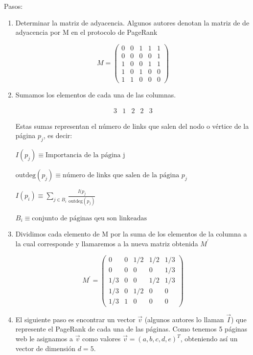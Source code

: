 \documentclass[11pt, spanish]{report}
\begin{document}
Pasos:
\begin{enumerate}
\item Determinar la matriz de adyacencia. Algunos autores denotan la matriz de de adyacencia por M en el protocolo de PageRank

\[
M = \begin{pmatrix}
0 & 0 & 1 & 1 & 1 \\
0 & 0 & 0 & 0 & 1 \\
1 & 0 & 0 & 1 & 1 \\
1 & 0 & 1 & 0 & 0 \\
1 & 1 & 0 & 0 & 0
\end{pmatrix}
\]

\item Sumamos los elementos de cada una de las columnas.

\[
\begin{matrix}
3 & 1 & 2 & 2 & 3
\end{matrix}
\]

Estas sumas representan el número de links que salen del nodo o vértice de la página $p_j$, es decir: 

$I(p_j) \equiv \text{Importancia de la página j}$

$\mathrm{outdeg}(p_j) \equiv \text{número de links que salen de la página } p_j$

$I(p_i) \equiv \sum\limits_{j \in B_i} \frac{I(p_j}{\mathrm{outdeg}(p_j)}$

$B_i \equiv \text{conjunto de páginas qeu son linkeadas}$

\item Dividimos cada elemento de M por la suma de los elementos de la columna a la cual corresponde y llamaremos a la nueva matriz obtenida $M^\prime$

\[
M^\prime = \begin{pmatrix}
0 & 0 & 1/2 & 1/2 & 1/3 \\
0 & 0 & 0 & 0 & 1/3 \\
1/3 & 0 & 0 & 1/2 & 1/3 \\
1/3 & 0 & 1/2 & 0 & 0 \\
1/3 & 1 & 0 & 0 & 0
\end{pmatrix}
\]

\item El siguiente paso es encontrar un vector $\vec{v}$ (algunos autores lo llaman $\vec{I}$) que represente el PageRank de cada una de las páginas. Como tenemos 5 páginas web le asignamos a $\vec{v}$ como valores $\vec{v} = (a,b,c,d,e)^T$, obteniendo así un vector de dimensión $d=5$.


\end{enumerate}
\end{document}
